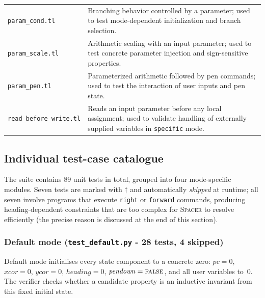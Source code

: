 \begin{longtable}{p{} p{}}
\texttt{param\_cond.tl} & Branching behavior controlled by a parameter; used to test mode-dependent initialization and branch selection. \\
\texttt{param\_scale.tl} & Arithmetic scaling with an input parameter; used to test concrete parameter injection and sign-sensitive properties. \\
\texttt{param\_pen.tl} & Parameterized arithmetic followed by pen commands; used to test the interaction of user inputs and pen state. \\
\texttt{read\_before\_write.tl} & Reads an input parameter before any local assignment; used to validate handling of externally supplied variables in \texttt{specific} mode. \\
\bottomrule
\end{longtable}

\subsection*{Individual test-case catalogue}

The suite contains 89 unit tests in total, grouped into four mode-specific modules.
Seven tests are marked with $\dagger$ and automatically \emph{skipped} at runtime; all
seven involve programs that execute \texttt{right} or \texttt{forward} commands, producing
heading-dependent constraints that are too complex for \textsc{Spacer} to resolve
efficiently (the precise reason is discussed at the end of this section).

\subsubsection*{Default mode \textnormal{(\texttt{test\_default.py} - 28 tests, 4 skipped)}}

Default mode initialises every state component to a concrete zero:
$\mathit{pc}=0$, $\mathit{xcor}=0$, $\mathit{ycor}=0$, $\mathit{heading}=0$,
$\mathit{pendown}=\textsc{false}$, and all user variables to~0.
The verifier checks whether a candidate property is an inductive invariant
from this fixed initial state.

